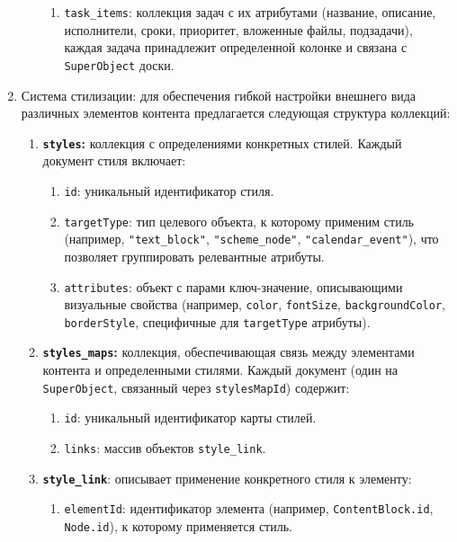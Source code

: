 \begin{enumerate}
\begin{enumerate}
\begin{enumerate}
                \item \texttt{task\_items}: коллекция задач с их атрибутами (название, описание, исполнители, сроки, приоритет, вложенные файлы, подзадачи), каждая задача принадлежит определенной колонке и связана с \texttt{SuperObject} доски.
             \end{enumerate}
    \end{enumerate}
\item Система стилизации: для обеспечения гибкой настройки внешнего вида различных элементов контента предлагается следующая структура коллекций:
    \begin{enumerate}
        \item \textbf{\texttt{styles}:} коллекция с определениями конкретных стилей. Каждый документ стиля включает:
            \begin{enumerate}
                \item \texttt{id}: уникальный идентификатор стиля.
                \item \texttt{targetType}: тип целевого объекта, к которому применим стиль (например, \texttt{"text\_block"}, \texttt{"scheme\_node"}, \texttt{"calendar\_event"}), что позволяет группировать релевантные атрибуты.
                \item \texttt{attributes}: объект с парами ключ-значение, описывающими визуальные свойства (например, \texttt{color}, \texttt{fontSize}, \texttt{backgroundColor}, \texttt{borderStyle}, специфичные для \texttt{targetType} атрибуты).
            \end{enumerate}
        \item \textbf{\texttt{styles\_maps}:} коллекция, обеспечивающая связь между элементами контента и определенными стилями. Каждый документ (один на \texttt{SuperObject}, связанный через \texttt{stylesMapId}) содержит:
            \begin{enumerate}
                \item \texttt{id}: уникальный идентификатор карты стилей.
                \item \texttt{links}: массив объектов \texttt{style\_link}.
            \end{enumerate}
        \item \textbf{\texttt{style\_link}}: описывает применение конкретного стиля к элементу:
            \begin{enumerate}
                \item \texttt{elementId}: идентификатор элемента (например, \texttt{ContentBlock.id}, \texttt{Node.id}), к которому применяется стиль.

\end{enumerate}
\end{enumerate}
\end{enumerate}
